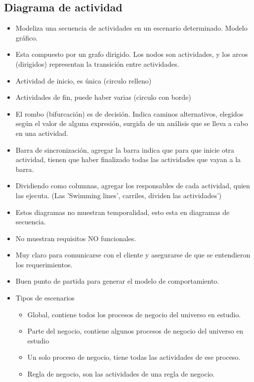 \documentclass[titlepage,a4paper]{article}
\begin{document}
\subsection{Diagrama de actividad}
    \begin{itemize}
        \item Modeliza una secuencia de actividades en un escenario determinado. Modelo gráfico.
        \item Esta compuesto por un grafo dirigido. Los nodos son actividades, y los arcos (dirigidos) representan la transición entre actividades.
        \item Actividad de inicio, es única (circulo relleno) 
        \item Actividades de fin, puede haber varias (circulo con borde)
        \item El rombo (bifurcación) es de decisión. Indica caminos alternativos, elegidos según el valor de alguna expresión, surgida de un análisis que se lleva a cabo en una actividad.
        \item Barra de sincronización, agregar la barra indica que para que inicie otra actividad, tienen que haber finalizado todas las actividades que vayan a la barra.
        \item Dividiendo como columnas, agregar los responsables de cada actividad, quien las ejecuta. (Las 'Swimming lines', carriles, dividen las actividades')
        \item Estos diagramas no muestran temporalidad, esto esta en diagramas de secuencia.
        \item No muestran requisitos NO funcionales.
        \item Muy claro para comunicarse con el cliente y asegurarse de que se entendieron los requerimientos.
        \item Buen punto de partida para generar el modelo de comportamiento.
        \item Tipos de escenarios
        \begin{itemize}
            \item Global, contiene todos los procesos de negocio del universo en estudio.
            \item Parte del negocio, contiene algunos procesos de negocio del universo en estudio
            \item Un solo proceso de negocio, tiene todas las actividades de ese proceso.
            \item Regla de negocio, son las actividades de una regla de negocio.
        \end{itemize}
    \end{itemize}
\end{document}
